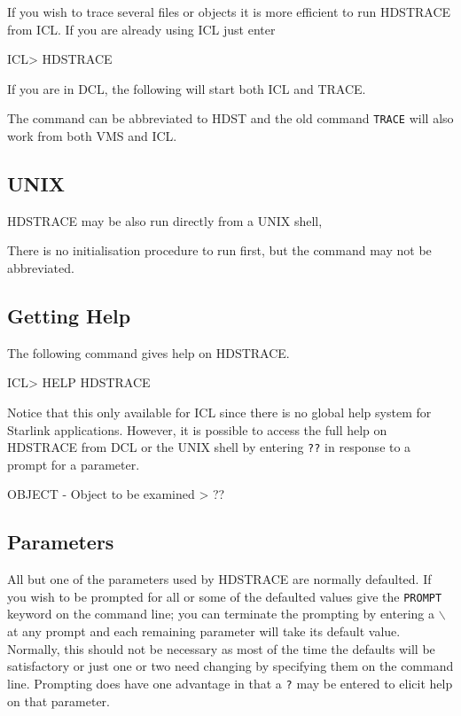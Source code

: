 \documentclass[11pt,nolof]{starlink}
\begin{document}
If you wish to trace several files or objects
it is more efficient to run {\footnotesize HDSTRACE} from ICL.
If you are already using ICL just enter

\small
\begin{terminalv}
ICL> HDSTRACE
\end{terminalv}
If you are in DCL, the following will start both ICL and {\footnotesize
TRACE}.
\normalsize
The command can be abbreviated to HDST and the old command \texttt{TRACE}
will also work from both VMS and ICL.

\subsection{UNIX}
{\footnotesize HDSTRACE} may be also run directly from a UNIX shell,
\small
\begin{terminalv}
\end{terminalv}
\normalsize
There is no initialisation procedure to run first, but the command may
not be abbreviated.

\subsection{Getting Help}
The following command gives help on HDSTRACE.
\small
\begin{terminalv}
ICL> HELP HDSTRACE
\end{terminalv}
\normalsize
Notice that this only available for ICL since there is no global help
system for Starlink applications.  However, it is possible to access
the full help on {\footnotesize HDSTRACE} from DCL or the UNIX shell by
entering \texttt{??} in response to a prompt for a parameter.

\small
\begin{terminalv}
OBJECT - Object to be examined > ??
\end{terminalv}
\normalsize
\subsection{Parameters}
All but one of the parameters used by {\footnotesize HDSTRACE} are
normally defaulted.  If you wish to be prompted for all or some of the
defaulted values give the \texttt{PROMPT} keyword on the command line; you
can terminate the prompting by entering a \texttt{$\backslash$} at any
prompt and each remaining parameter will take its default value.
Normally, this should not be necessary as most of the time the defaults
will be satisfactory or just one or two need changing by specifying them
on the command line. Prompting does have one advantage in that a \texttt{?}
may be entered to elicit help on that parameter.
\end{document}
